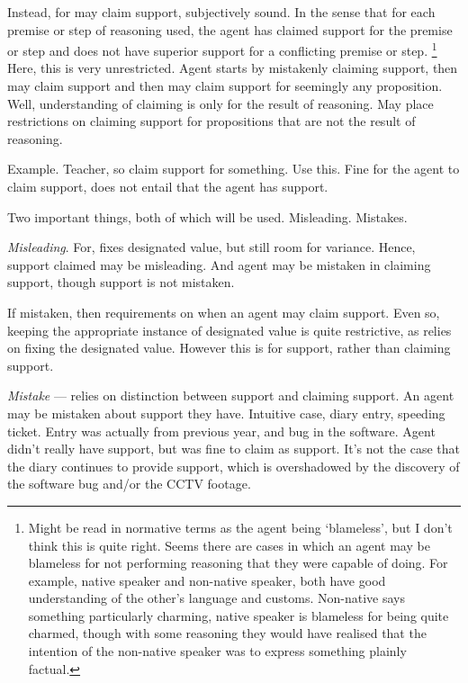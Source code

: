 \begin{note}[Support]
  Instead, for {may} claim support, subjectively sound.
  In the sense that for each premise or step of reasoning used, the agent has claimed support for the premise or step and does not have superior support for a conflicting premise or step.\nolinebreak
  \footnote{
    Might be read in normative terms as the agent being `blameless', but I don't think this is quite right.
    Seems there are cases in which an agent may be blameless for not performing reasoning that they were capable of doing.
    For example, native speaker and non-native speaker, both have good understanding of the other's language and customs.
    Non-native says something particularly charming, native speaker is blameless for being quite charmed, though with some reasoning they would have realised that the intention of the non-native speaker was to express something plainly factual.
  }
  Here, this is very unrestricted.
  Agent starts by mistakenly claiming support, then may claim support and then may claim support for seemingly any proposition.
  Well, understanding of claiming is only for the result of reasoning.
  May place restrictions on claiming support for propositions that are not the result of reasoning.

  Example.
  Teacher, so claim support for something.
  Use this.
  Fine for the agent to claim support, does not entail that the agent has support.

  Two important things, both of which will be used.
  Misleading.
  Mistakes.

  \emph{Misleading}.
  For, fixes designated value, but still room for variance.
  Hence, support claimed may be misleading.
  And agent may be mistaken in claiming support, though support is not mistaken.

  If mistaken, then requirements on when an agent may claim support.
  Even so, keeping the appropriate instance of designated value is quite restrictive, as relies on fixing the designated value.
  However this is for support, rather than claiming support.

  \emph{Mistake} --- relies on distinction between support and claiming support.
  An agent may be mistaken about support they have.
  Intuitive case, diary entry, speeding ticket.
  Entry was actually from previous year, and bug in the software.
  Agent didn't really have support, but was fine to claim as support.
  It's not the case that the diary continues to provide support, which is overshadowed by the discovery of the software bug and/or the CCTV footage.


\end{note}
